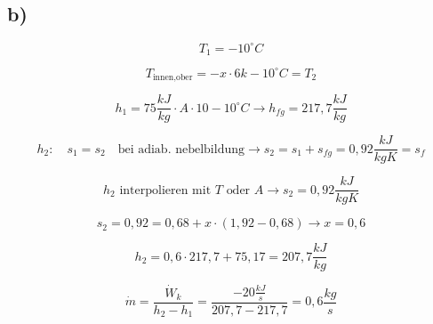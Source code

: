 

\subsection*{b)}

\[
T_1 = -10^\circ C
\]

\[
T_{\text{innen,ober}} = -x \cdot 6k - 10^\circ C = T_2
\]

\[
h_1 = 75 \frac{kJ}{kg} \cdot A \cdot 10 - 10^\circ C \rightarrow h_{fg} = 217,7 \frac{kJ}{kg}
\]

\[
h_2: \quad s_1 = s_2 \quad \text{bei adiab. nebelbildung} \rightarrow s_2 = s_1 + s_{fg} = 0,92 \frac{kJ}{kgK} = s_f
\]

\[
h_2 \text{ interpolieren mit } T \text{ oder } A \rightarrow s_2 = 0,92 \frac{kJ}{kgK}
\]

\[
s_2 = 0,92 = 0,68 + x \cdot (1,92 - 0,68) \rightarrow x = 0,6
\]

\[
h_2 = 0,6 \cdot 217,7 + 75,17 = 207,7 \frac{kJ}{kg}
\]

\[
\dot{m} = \frac{\dot{W}_k}{h_2 - h_1} = \frac{-20 \frac{kJ}{s}}{207,7 - 217,7} = 0,6 \frac{kg}{s}
\]